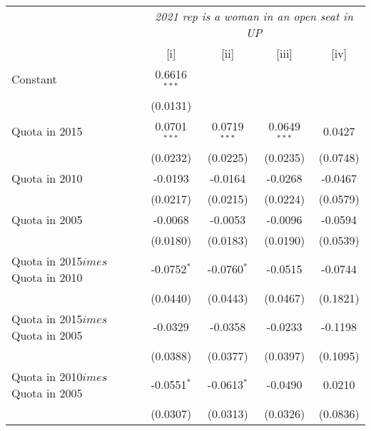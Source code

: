 
\begingroup
\centering
\begin{tabular}{lcccc}
   \toprule
    & \multicolumn{4}{c}{\textit{2021 rep is a woman in an open seat in UP}}\\
                                                           & [i]            & [ii]           & [iii]          & [iv]\\  
   \midrule 
   Constant                                                & 0.6616$^{***}$ &                &                &   \\   
                                                           & (0.0131)       &                &                &   \\   
   Quota in 2015                                           & 0.0701$^{***}$ & 0.0719$^{***}$ & 0.0649$^{***}$ & 0.0427\\   
                                                           & (0.0232)       & (0.0225)       & (0.0235)       & (0.0748)\\   
   Quota in 2010                                           & -0.0193        & -0.0164        & -0.0268        & -0.0467\\   
                                                           & (0.0217)       & (0.0215)       & (0.0224)       & (0.0579)\\   
   Quota in 2005                                           & -0.0068        & -0.0053        & -0.0096        & -0.0594\\   
                                                           & (0.0180)       & (0.0183)       & (0.0190)       & (0.0539)\\   
   Quota in 2015$	imes$Quota in 2010                      & -0.0752$^{*}$  & -0.0760$^{*}$  & -0.0515        & -0.0744\\   
                                                           & (0.0440)       & (0.0443)       & (0.0467)       & (0.1821)\\   
   Quota in 2015$	imes$Quota in 2005                      & -0.0329        & -0.0358        & -0.0233        & -0.1198\\   
                                                           & (0.0388)       & (0.0377)       & (0.0397)       & (0.1095)\\   
   Quota in 2010$	imes$Quota in 2005                      & -0.0551$^{*}$  & -0.0613$^{*}$  & -0.0490        & 0.0210\\   
                                                           & (0.0307)       & (0.0313)       & (0.0326)       & (0.0836)\\   

\end{tabular}
